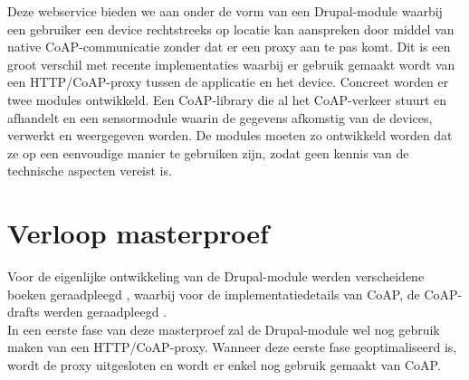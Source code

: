 Deze webservice bieden we aan onder de vorm van een Drupal-module waarbij een gebruiker een device rechtstreeks op locatie kan aanspreken door middel van native CoAP-communicatie zonder dat er een proxy aan te pas komt. Dit is een groot verschil met recente implementaties waarbij er gebruik gemaakt wordt van een HTTP/CoAP-proxy tussen de applicatie en het device. Concreet worden er twee modules ontwikkeld. Een CoAP-library die al het CoAP-verkeer stuurt en afhandelt en een sensormodule waarin de gegevens afkomstig van de devices, verwerkt en weergegeven worden. De modules moeten zo ontwikkeld worden dat ze op een eenvoudige manier te gebruiken zijn, zodat geen kennis van de technische aspecten vereist is.\\

\section{Verloop masterproef}
Voor de eigenlijke ontwikkeling van de Drupal-module werden verscheidene boeken geraadpleegd \cite{beginDrupal} \cite{proDrupal} \cite{drupalDefGuide}, waarbij voor de implementatiedetails van CoAP, de CoAP-drafts werden geraadpleegd \cite{coapDraft} \cite{coapObserveDraft} \cite{coapConditionalObserveDraft} \cite{coapDiscovery} \cite{blockwiseTransfer} \cite{coreInterfaces}.\\
In een eerste fase van deze masterproef zal de Drupal-module wel nog gebruik maken van een HTTP/CoAP-proxy. Wanneer deze eerste fase geoptimaliseerd is, wordt de proxy uitgesloten en wordt er enkel nog gebruik gemaakt van CoAP.\\

